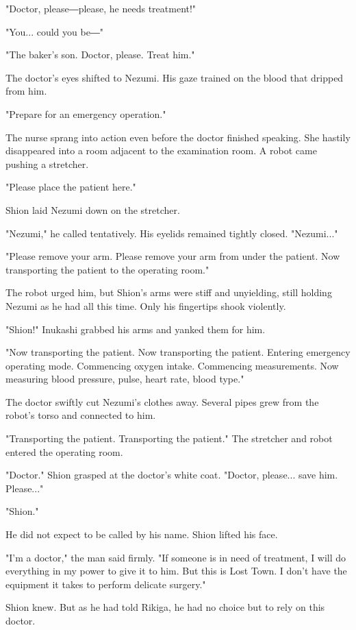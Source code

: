 "Doctor, please―please, he needs treatment!"

"You... could you be―"

"The baker's son. Doctor, please. Treat him."

The doctor's eyes shifted to Nezumi. His gaze trained on the blood that
dripped from him.

"Prepare for an emergency operation."

The nurse sprang into action even before the doctor finished speaking.
She hastily disappeared into a room adjacent to the examination room. A
robot came pushing a stretcher.

"Please place the patient here."

Shion laid Nezumi down on the stretcher.

"Nezumi," he called tentatively. His eyelids remained tightly closed.
"Nezumi..."

"Please remove your arm. Please remove your arm from under the patient.
Now transporting the patient to the operating room."

The robot urged him, but Shion's arms were stiff and unyielding, still
holding Nezumi as he had all this time. Only his fingertips shook
violently.

"Shion!" Inukashi grabbed his arms and yanked them for him.

"Now transporting the patient. Now transporting the patient. Entering
emergency operating mode. Commencing oxygen intake. Commencing
measurements. Now measuring blood pressure, pulse, heart rate, blood
type."

The doctor swiftly cut Nezumi's clothes away. Several pipes grew from
the robot's torso and connected to him.

"Transporting the patient. Transporting the patient." The stretcher and
robot entered the operating room.

"Doctor." Shion grasped at the doctor's white coat. "Doctor, please...
save him. Please..."

"Shion."

He did not expect to be called by his name. Shion lifted his face.

"I'm a doctor," the man said firmly. "If someone is in need of
treatment, I will do everything in my power to give it to him. But this
is Lost Town. I don't have the equipment it takes to perform delicate
surgery."

Shion knew. But as he had told Rikiga, he had no choice but to rely on
this doctor.

